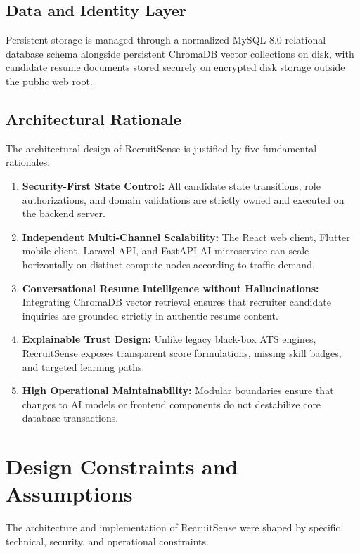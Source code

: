 \subsection{Data and Identity Layer}
Persistent storage is managed through a normalized MySQL 8.0 relational database schema alongside persistent ChromaDB vector collections on disk, with candidate resume documents stored securely on encrypted disk storage outside the public web root.

\subsection{Architectural Rationale}
The architectural design of RecruitSense is justified by five fundamental rationales:
\begin{enumerate}
    \item \textbf{Security-First State Control:} All candidate state transitions, role authorizations, and domain validations are strictly owned and executed on the backend server.
    \item \textbf{Independent Multi-Channel Scalability:} The React web client, Flutter mobile client, Laravel API, and FastAPI AI microservice can scale horizontally on distinct compute nodes according to traffic demand.
    \item \textbf{Conversational Resume Intelligence without Hallucinations:} Integrating ChromaDB vector retrieval ensures that recruiter candidate inquiries are grounded strictly in authentic resume content.
    \item \textbf{Explainable Trust Design:} Unlike legacy black-box ATS engines, RecruitSense exposes transparent score formulations, missing skill badges, and targeted learning paths.
    \item \textbf{High Operational Maintainability:} Modular boundaries ensure that changes to AI models or frontend components do not destabilize core database transactions.
\end{enumerate}

\section{Design Constraints and Assumptions}
The architecture and implementation of RecruitSense were shaped by specific technical, security, and operational constraints.

